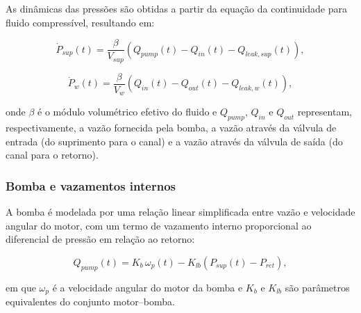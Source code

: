 As dinâmicas das pressões são obtidas a partir da equação da continuidade para fluido compressível, resultando em:

\begin{equation}
\dot{P}_{sup}(t) = \frac{\beta}{V_{sup}}\left(Q_{pump}(t) - Q_{in}(t) - Q_{leak,sup}(t)\right),
\label{eq:psup_dot}
\end{equation}

\begin{equation}
\dot{P}_{w}(t) = \frac{\beta}{V_{w}}\left(Q_{in}(t) - Q_{out}(t) - Q_{leak,w}(t)\right),
\label{eq:pw_dot}
\end{equation}

onde $\beta$ é o módulo volumétrico efetivo do fluido e $Q_{pump}$, $Q_{in}$ e $Q_{out}$ representam, respectivamente, a vazão fornecida pela bomba, a vazão através da válvula de entrada (do suprimento para o canal) e a vazão através da válvula de saída (do canal para o retorno).

\subsubsection{Bomba e vazamentos internos}
\label{sec:controle-bomba-2p}

A bomba é modelada por uma relação linear simplificada entre vazão e velocidade angular do motor, com um termo de vazamento interno proporcional ao diferencial de pressão em relação ao retorno:

\begin{equation}
Q_{pump}(t) = K_b\,\omega_p(t) - K_{lb}\left(P_{sup}(t) - P_{ret}\right),
\label{eq:qpump_2p}
\end{equation}

em que $\omega_p$ é a velocidade angular do motor da bomba e $K_b$ e $K_{lb}$ são parâmetros equivalentes do conjunto motor--bomba.


